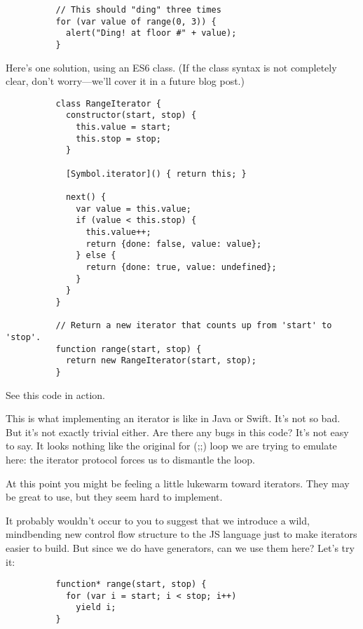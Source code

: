         \begin{lstlisting}
          // This should "ding" three times
          for (var value of range(0, 3)) {
            alert("Ding! at floor #" + value);
          }
        \end{lstlisting}

        Here's one solution, using an ES6 class. (If the class syntax is not completely clear, don't worry—we'll cover it in a future blog post.)

        \begin{lstlisting}
          class RangeIterator {
            constructor(start, stop) {
              this.value = start;
              this.stop = stop;
            }

            [Symbol.iterator]() { return this; }

            next() {
              var value = this.value;
              if (value < this.stop) {
                this.value++;
                return {done: false, value: value};
              } else {
                return {done: true, value: undefined};
              }
            }
          }

          // Return a new iterator that counts up from 'start' to 'stop'.
          function range(start, stop) {
            return new RangeIterator(start, stop);
          }
        \end{lstlisting}

        See this code in action.

        This is what implementing an iterator is like in Java or Swift. It's not so bad. But it's not exactly trivial either. Are there any bugs in this code? It's not easy to say. It looks nothing like the original for (;;) loop we are trying to emulate here: the iterator protocol forces us to dismantle the loop.

        At this point you might be feeling a little lukewarm toward iterators. They may be great to use, but they seem hard to implement.

        It probably wouldn't occur to you to suggest that we introduce a wild, mindbending new control flow structure to the JS language just to make iterators easier to build. But since we do have generators, can we use them here? Let's try it:

        \begin{lstlisting}
          function* range(start, stop) {
            for (var i = start; i < stop; i++)
              yield i;
          }
        \end{lstlisting}

